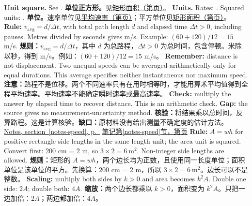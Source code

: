 {\textbf{Unit square.} See .}
 {\textbf{单位正方形。}见\hyperref[concept-area]{矩形面积（第\pageref*{concept-area}页）}。}
 {\textbf{Units.} Rates: . Squared units: .}
 {\textbf{单位。}速率单位见\hyperref[concept-speed]{平均速率（第\pageref*{concept-speed}页）}；平方单位见\hyperref[concept-area]{矩形面积（第\pageref*{concept-area}页）}。}
\clearpage
{}
 {\textbf{Rule:} $v_{\mathrm{avg}}=d/\Delta t$, with total path length $d$ and elapsed time $\Delta t>0$, including pauses. Metres divided by seconds gives m/s. Example: $(60+120)/12=15$ m/s.}
 {\textbf{规则：}$v_{\mathrm{avg}}=d/\Delta t$，其中 $d$ 为总路程，$\Delta t>0$ 为总时间，包含停顿。米除以秒，得到 m/s。例如：$(60+120)/12=15$ m/s。}
 {\textbf{Remember:} distance is not displacement. Two unequal speeds can be averaged arithmetically only for equal durations. This average specifies neither instantaneous nor maximum speed.}
 {\textbf{注意：}路程不是位移。两个不同速率只有在用时相等时，才能用算术平均值得到全程平均速率。平均速率不能确定瞬时速率或最高速率。}
 {\textbf{Check:} multiply the answer by elapsed time to recover distance. This is an arithmetic check. \textbf{Gap:} the source gives no measurement-uncertainty method.}
 {\textbf{核验：}将结果乘以总时间，反算路程。这是计算核验。\textbf{缺口：}原材料没有给出测量不确定度的估计方法。}
 {\hyperref[notes-speed]{Notes, section~\ref*{notes-speed}, p.~\pageref*{notes-speed}}}
 {\hyperref[notes-speed]{笔记第\ref*{notes-speed}节，第\pageref*{notes-speed}页}}
 {\textbf{Rule:} $A=wh$ for positive rectangle side lengths in the same length unit; the area unit is squared. Convert first: 200 cm = 2 m, so $3\times2=6\ \mathrm{m^2}$. Non-integer side lengths are allowed.}
 {\textbf{规则：}矩形的 $A=wh$，两个边长均为正数，且使用同一长度单位；面积单位是该单位的平方。先换算：200 cm = 2 m，所以 $3\times2=6\ \mathrm{m^2}$。边长可以不是整数。}
 {\textbf{Scaling:} multiply both sides by $k>0$ and area becomes $k^2A$. Double one side: $2A$; double both: $4A$.}
 {\textbf{缩放：}两个边长都乘以 $k>0$，面积变为 $k^2A$。只把一边加倍：$2A$；两边都加倍：$4A$。}
